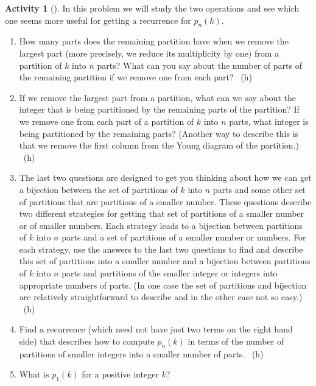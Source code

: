 \documentclass[10pt,]{book}
\theoremstyle{plain}
\theoremstyle{definition}
\theoremstyle{definition}
\theoremstyle{definition}
\newtheorem{activity}[project]{Activity}
\numberwithin{equation}{chapter}
\begin{document}
\begin{activity}[]\label{numberpartitionrecurrence}
\hypertarget{p-1142}{}%
In this problem we will study the two operations and see which one seems more useful for getting a recurrence for \(p_n(k)\).%
\begin{enumerate}[font=\bfseries,label=(\alph*),ref=\alph*]
\item\label{task-217} \hypertarget{p-1143}{}%
How many parts does the remaining partition have when we remove the largest part (more precisely, we reduce its multiplicity by one) from a partition of \(k\) into \(n\) parts?  What can you say about the number of parts of the remaining partition if we remove one from each part?%
~{\tiny (h)}\item\label{task-218} \hypertarget{p-1146}{}%
If we remove the largest part from a partition, what can we say about the integer that is being partitioned by the remaining parts of the partition? If we remove one from each part of a partition of \(k\) into \(n\) parts, what integer is being partitioned by the remaining parts? (Another way to describe this is that we remove the first column from the Young diagram of the partition.)%
~{\tiny (h)}\item\label{task-219} \hypertarget{p-1149}{}%
The last two questions are designed to get you thinking about how we can get a bijection between the set of partitions of \(k\) into \(n\) parts and some other set of partitions that are partitions of a smaller number.  These questions describe two different strategies for getting that set of partitions of a smaller number or of smaller numbers.  Each strategy leads to a bijection between partitions of \(k\) into \(n\) parts and a set of partitions of a smaller number or numbers.  For each strategy, use the answers to the last two questions to find and describe this set of partitions into a smaller number and a bijection between partitions of \(k\) into \(n\) parts and partitions of the smaller integer or integers into appropriate numbers of parts. (In one case the set of partitions and bijection are relatively straightforward to describe and in the other case not so easy.)%
~{\tiny (h)}\item\label{task-220} \hypertarget{p-1153}{}%
Find a recurrence (which need not have just two terms on the right hand side) that describes how to compute \(p_n(k)\) in terms of the number of partitions of smaller integers into a smaller number of parts.%
~{\tiny (h)}\item\label{task-221} \hypertarget{p-1156}{}%
What is \(p_1(k)\) for a positive integer \(k\)?%

\end{enumerate}
\end{activity}
\end{document}

